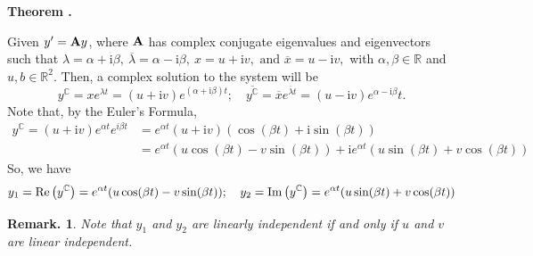\documentclass[12pt, a4paper]{article}
\newcounter{index}[subsection]
\newenvironment*{thm}[1]{\begin{tcolorbox}\par\noindent\textbf{Theorem \thesubsection.\stepcounter{index}\theindex\ #1} \par}{\par\end{tcolorbox}}
\newtheorem*{rmk}{Remark.}
\def\R{{\mathbb{R}}}
\def\C{{\mathbb{C}}}
\def\i{{\mathrm{i}}}
\def\A{\vb A}
\begin{document}
\begin{thm}{}
	Given $y'=\A y$, where $\A$ has complex conjugate eigenvalues and eigenvectors such that $\lambda=\alpha+\i\beta,\ \overline{\lambda}=\alpha-\i\beta,\ x=u+\i v,\text{ and }\overline{x}=u-\i v,$	with $\alpha,\beta\in\R$ and $u,b\in\R^2$. Then, a complex solution to the system will be \[y^\C=xe^{\lambda t}=(u+\i v)e^{(\alpha+\i\beta)t};\quad\overline{y^\C}=\overline{x}e^{\overline{\lambda}t}=(u-\i v)e^{\alpha-\i\beta}t.\] Note that, by the Euler's Formula, \begin{align*}y^\C=(u+\i v)e^{\alpha t}e^{i\beta t}&=e^{\alpha t}(u+\i v)(\cos(\beta t)+\i\sin(\beta t))\\&=e^{\alpha t}(u\cos(\beta t)-v\sin(\beta t))+\i e^{\alpha t}(u\sin(\beta t)+v\cos(\beta t))\end{align*} So, we have \[y_1=\Re\qty(y^\C)=e^{\alpha t}(u\cos(\beta t)-v\sin(\beta t));\quad y_2=\Im\qty(y^\C)=e^{\alpha t}(u\sin(\beta t)+v\cos(\beta t))\]
\end{thm}
\begin{rmk}
	Note that $y_1$ and $y_2$ are linearly independent if and only if $u$ and $v$ are linear independent. 	
\end{rmk}
\end{document}

